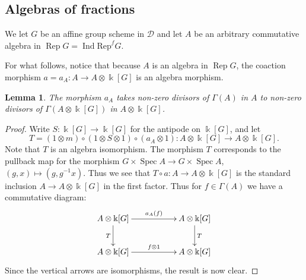 \documentclass[11pt]{amsart}
\def\Dist{\operatorname{Dist}}
\def\Ind{\operatorname{Ind}}
\def\Ds{\mathscr{D}}
\def\bk{\Bbbk}
\def\Rep{\operatorname{Rep}}
\def\Spec{\operatorname{Spec}}
\def\sub{\subseteq}
\newtheorem{lemma}[thm]{Lemma}
\theoremstyle{definition}
\theoremstyle{remark}
\numberwithin{equation}{section}
\begin{document}

    
    
    


\subsection{Algebras of fractions} We let $G$ be an affine group scheme in $\Ds$ and let $A$ be an arbitrary commutative algebra in $\Rep G=\Ind\mathrm{Rep}^fG$. 


  



For what follows, notice that because $A$ is an algebra in $\Rep G$, the coaction morphism $a=a_A:A\to A\otimes\Bbbk[G]$ is an algebra morphism.  

\begin{lemma}\label{lemma coaction non zero div}
    The morphism $a_A$ takes non-zero divisors of $\Gamma(A)$ in $A$ to non-zero divisors of $\Gamma(A\otimes\bk[G])$ in $A\otimes\bk[G]$.
\end{lemma}
\begin{proof}
    Write $S:\Bbbk[G]\to\Bbbk[G]$ for the antipode on $\Bbbk[G]$, and let 
    \[
    T=(1\otimes m)\circ(1\otimes S\otimes 1)\circ(a_A\otimes 1):A\otimes\Bbbk[G]\to A\otimes\Bbbk[G].
    \]
    Note that $T$ is an algebra isomorphism.  The morphism $T$ corresponds to the pullback map for the morphism $G\times \Spec A\to G\times \Spec A$, $(g,x)\mapsto (g,g^{-1}x)$.  Thus we see that $T\circ a:A\to A\otimes\Bbbk[G]$ is the standard inclusion $A\to A\otimes\Bbbk[G]$ in the first factor. Thus for $f\in \Gamma(A)$ we have a commutative diagram:
    \[
    \xymatrix{
    A\otimes \Bbbk[G] \ar[rr]^{a_A(f)} \ar[d]_{T} && A\otimes\Bbbk[G] \ar[d]^{T}\\
    A\otimes\Bbbk[G]\ar[rr]^{f\otimes 1} && A\otimes\Bbbk[G]
    }
    \]
    Since the vertical arrows are isomorphisms, the result is now clear.
\end{proof}
\end{document}
